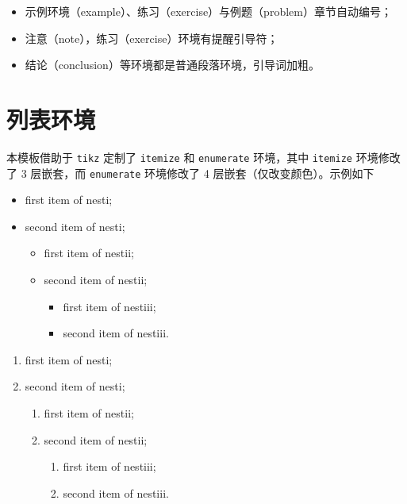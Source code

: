 \documentclass[cn,11pt]{elegantbook}
\begin{document}
\begin{itemize}
  \item 示例环境（example）、练习（exercise）与例题（problem）章节自动编号；
  \item 注意（note），练习（exercise）环境有提醒引导符；
  \item 结论（conclusion）等环境都是普通段落环境，引导词加粗。
\end{itemize}

\section{列表环境}
本模板借助于 \lstinline{tikz} 定制了 \lstinline{itemize} 和 \lstinline{enumerate} 环境，其中 \lstinline{itemize} 环境修改了 3 层嵌套，而 \lstinline{enumerate} 环境修改了 4 层嵌套（仅改变颜色）。示例如下\\[2ex]
\begin{minipage}[b]{0.49\textwidth}
  \begin{itemize}
    \item first item of nesti;
    \item second item of nesti;
      \begin{itemize}
        \item first item of nestii;
        \item second item of nestii;
        \begin{itemize}
          \item first item of nestiii;
          \item second item of nestiii.
        \end{itemize}   
      \end{itemize}
  \end{itemize}
\end{minipage}
\begin{minipage}[b]{0.49\textwidth}
  \begin{enumerate}
    \item first item of nesti;
    \item second item of nesti;
      \begin{enumerate}
        \item first item of nestii;
        \item second item of nestii;
        \begin{enumerate}
          \item first item of nestiii;
          \item second item of nestiii.
        \end{enumerate}   
      \end{enumerate}
  \end{enumerate}
\end{minipage}
\end{document}
